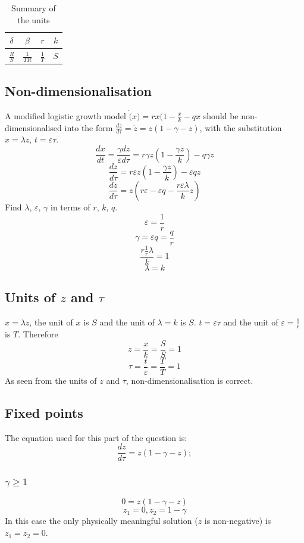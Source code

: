 \documentclass[a4paper]{article}
\begin{document}
\begin{table}[htbp]
\centering
\caption{Summary of the units}
\label{table1}
\begin{center}
    \begin{tabular}{c c c c}
    \toprule
     $\delta$ & $\beta$ & $r$ & $k$ \\ 
    \midrule
	 $\frac{R}{S}$ & $\frac{1}{TR}$ & $\frac{1}{T}$ & $S$ \\ 
    \bottomrule
    \end{tabular}
\end{center}
\end{table}


\subsection{Non-dimensionalisation}
A modified logistic growth model \(\dot(x) = rx(1 - \frac{x}{k} - qx\) should be non-dimensionalised into the form \(\frac{dz}{d\tau} = \dot{z} = z(1 - \gamma - z)\), with the substitution \(x = \lambda z\), \(t = \varepsilon \tau\). 
\[\frac{dx}{dt} = \frac{\gamma dz}{\varepsilon d\tau} = r\gamma z(1 - \frac{\gamma z }{k}) - q\gamma z\]
\[\frac{dz}{d\tau} = r\varepsilon z(1 - \frac{\gamma z}{k}) - \varepsilon qz\]
\[\frac{dz}{d\tau} = z(r\varepsilon - \varepsilon q - \frac{r\varepsilon \lambda}{k}z) \]
Find $\lambda$, $\varepsilon$, $\gamma$ in terms of $r$, $k$, $q$.
\[\varepsilon = \frac{1}{r}\]
\[\gamma = \varepsilon q = \frac{q}{r}\]
\[\frac{r\frac{1}{r}\lambda}{k} = 1\]
\[\lambda = k\]

\subsection{Units of $z$ and $\tau$}
\(x = \lambda z\), the unit of $x$ is $S$ and the unit of \(\lambda = k\) is $S$. \(t = \varepsilon \tau\) and the unit of \(\varepsilon = \frac{1}{r}\) is $T$. Therefore 
\[z = \frac{x}{k} = \frac{S}{S} = 1\] 
\[\tau = \frac{t}{\varepsilon} = \frac{T}{T} = 1\]
As seen from the units of $z$ and $\tau$, non-dimensionalisation is correct. 

\subsection{Fixed points}
The equation used for this part of the question is:
\begin{equation}
\frac{dz}{d\tau} = z(1 - \gamma - z); 
\end{equation}
\subsubsection{\(\gamma \geq 1\)}
\[0 = z(1-\gamma - z)\]
\[z_1 = 0, z_2 = 1 - \gamma\]
In this case the only physically meaningful solution ($z$ is non-negative) is \(z_1 = z_2 = 0\). 
\end{document}
